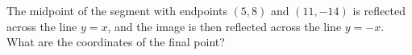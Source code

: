 The midpoint of the segment with endpoints $(5,8)$ and $(11,-14)$ is reflected across the line $y=x$, and the image is then reflected across the line $y=-x$. What are the coordinates of the final point?
